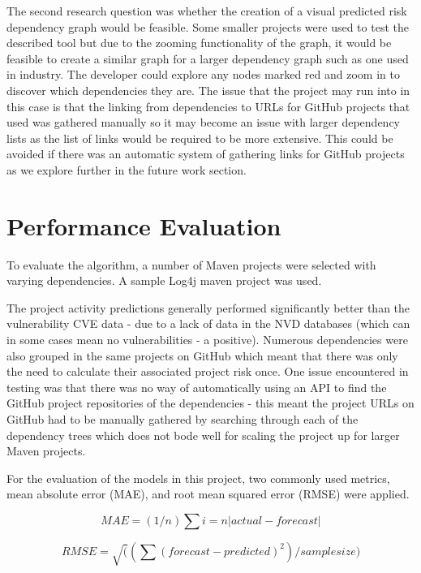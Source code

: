 \documentclass[conference]{IEEEtran}
\begin{document}
The second research question was whether the creation of a visual predicted risk dependency graph would be feasible. Some smaller projects were used to test the described tool but due to the zooming functionality of the graph, it would be feasible to create a similar graph for a larger dependency graph such as one used in industry. The developer could explore any nodes marked red and zoom in to discover which dependencies they are. The issue that the project may run into in this case is that the linking from dependencies to URLs for GitHub projects that used was gathered manually so it may become an issue with larger dependency lists as the list of links would be required to be more extensive. This could be avoided if there was an automatic system of gathering links for GitHub projects as we explore further in the future work section. 

\section{Performance Evaluation}
To evaluate the algorithm, a number of Maven projects were selected with varying dependencies. A sample Log4j maven project was used. 

The project activity predictions generally performed significantly better than the vulnerability CVE data - due to a lack of data in the NVD databases (which can in some cases mean no vulnerabilities - a positive). Numerous dependencies were also grouped in the same projects on GitHub which meant that there was only the need to calculate their associated project risk once. One issue encountered in testing was that there was no way of automatically using an API to find the GitHub project repositories of the dependencies - this meant the project URLs on GitHub had to be manually gathered by searching through each of the dependency trees which does not bode well for scaling the project up for larger Maven projects. 

For the evaluation of the models in this project, two commonly used metrics, mean absolute error (MAE), and root mean squared error (RMSE) were applied. 

\[ MAE = (1/n) \sum{i=n} |actual - forecast| \]

\[ RMSE = \sqrt( (\sum (forecast - predicted) ^ 2) / sample size )  \]
\end{document}
